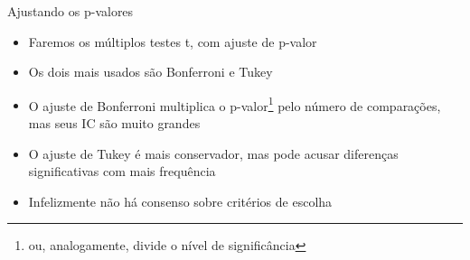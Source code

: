 \documentclass{beamer}
\begin{document}
\begin{frame}{\scriptsize Ajustando os p-valores}
  \begin{itemize}
    \footnotesize
  \item Faremos os múltiplos testes t, com ajuste de p-valor
  \item Os dois mais usados são Bonferroni e Tukey
    \bigskip
    \bigskip
 \item O ajuste de Bonferroni multiplica o p-valor\footnote{ou, analogamente, divide o nível de significância} pelo número de comparações, mas seus IC são muito grandes
    \bigskip
 \item O ajuste de Tukey é mais conservador, mas pode acusar diferenças significativas com mais frequência
    \bigskip
    \bigskip
 \item Infelizmente não há consenso sobre critérios de escolha
  \end{itemize}
\end{frame}
\end{document}
